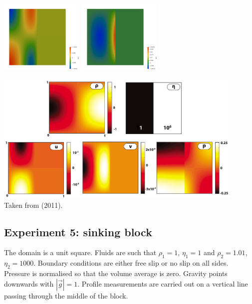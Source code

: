 \begin{center}
\includegraphics[width=4cm]{python_codes/fieldstone_158/results/exp3/eyy}
\includegraphics[width=4cm]{python_codes/fieldstone_158/results/exp3/exy}
\end{center} 

\begin{center}
\includegraphics[width=12cm]{python_codes/fieldstone_158/images/solcx}\\
{\captionfont Taken from \textcite{dumg11} (2011). }
\end{center} 

\newpage
\subsection*{Experiment 5: sinking block}

The domain is a unit square. Fluids are such that 
$\rho_1=1$, $\eta_1=1$ and $\rho_2=1.01$, $\eta_2=1000$.
Boundary conditions are either free slip or no slip on all sides. 
Pressure is normalised so that the volume average is zero. 
Gravity points downwards with $|\vec{g}|=1$.
Profile measurements are carried out on a vertical line 
passing through the middle of the block.

